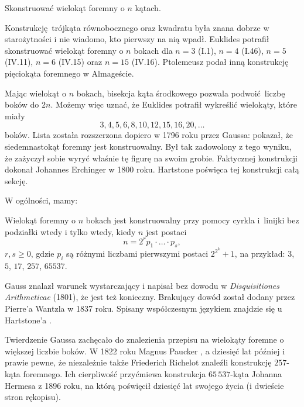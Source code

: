 \begin{problem}
    Skonstruować wielokąt foremny o $n$ kątach.
\end{problem}

Konstrukcję trójkąta równobocznego oraz kwadratu była znana dobrze w starożytności i nie wiadomo, kto pierwszy na nią wpadł.
Euklides potrafił skonstruować wielokąt foremny o $n$ bokach dla $n = 3$ (I.1), $n = 4$ (I.46), $n = 5$ (IV.11), $n = 6$ (IV.15) oraz $n = 15$ (IV.16).
Ptolemeusz podał inną konstrukcję pięciokąta foremnego w Almageście.

Mając wielokąt o $n$ bokach, bisekcja kąta środkowego pozwala podwoić liczbę boków do $2n$.
Możemy więc uznać, że Euklides potrafił wykreślić wielokąty, które miały
\begin{equation}
    3, 4, 5, 6, 8, 10, 12, 15, 16, 20, \ldots
\end{equation}
boków.
Lista została rozszerzona dopiero w 1796 roku przez Gaussa: pokazał, że siedemnastokąt foremny jest konstruowalny.
%
%
Był tak zadowolony z tego wyniku, że zażyczył sobie wyryć właśnie tę figurę na swoim grobie.
Faktycznej konstrukcji dokonał Johannes Erchinger w 1800 roku.
%
Hartstone \cite[s. 250-259]{hartshorne2000} poświęca tej konstrukcji całą sekcję.

W ogólności, mamy:
\begin{theorem}
    \label{gauss_wantzel}
    Wielokąt foremny o $n$ bokach jest konstruowalny przy pomocy cyrkla i~linijki bez podziałki wtedy i tylko wtedy, kiedy $n$ jest postaci
    \begin{equation}
        n = 2^r p_1 \cdot \ldots \cdot p_s,
    \end{equation}
    $r, s \ge 0$, gdzie $p_i$ są różnymi liczbami pierwszymi postaci $2^{2^k} + 1$, na przykład: $3$, $5$, $17$, $257$, $65537$.
\end{theorem}

Gauss znalazł warunek wystarczający i napisał bez dowodu w \emph{Disquisitiones Arithmeticae} (1801), że jest też konieczny.
Brakujący dowód został dodany przez Pierre'a Wantzla w 1837 roku.
Spisany współczesnym językiem znajdzie się u Hartstone'a \cite[s. 258]{hartshorne2000}.

Twierdzenie Gaussa zachęcało do znalezienia przepisu na wielokąty foremne o większej liczbie boków.
W 1822 roku Magnus Paucker \cite{paucker_1822}, a dziesięć lat później i prawie pewne, że niezależnie także Friederich Richelot \cite{richelot_1832} znaleźli konstrukcję $257$-kąta foremnego. 
%
%
Ich cierpliwość przyćmiewa konstrukcja $65\,537$-kąta Johanna Hermesa z 1896 roku, na którą poświęcił dziesięć lat swojego życia (i dwieście stron rękopisu).

